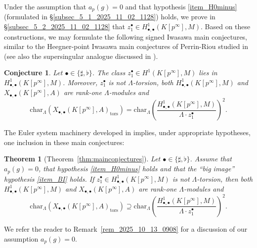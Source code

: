 \documentclass{amsart}
\numberwithin{equation}{section}
\newtheorem*{conjecture*}{Conjecture}
\newtheorem{lthm}{Theorem}
\newcommand{\Char}{\mathrm{char}}
\begin{document}
Under the assumption that $a_p(g)=0$ and that hypothesis \eqref{item_H0minus} (formulated in \S\ref{subsec_5_1_2025_11_02_1128}) holds, we prove in \S\ref{subsec_5_2_2025_11_02_1128} that $z_1^\bullet\in H^1_{\bullet,\bullet}(K[p^\infty],M)$. Based on these constructions, we may formulate the following signed Iwasawa main conjectures, similar to the Heegner-point Iwasawa main conjectures of Perrin-Riou studied in \cite{PR-Heegner-IMC} (see also the supersingular analogue discussed in \cite{castellawan}).




\begin{conjecture*}
    Let $\bullet\in \lbrace \sharp,\flat\rbrace$. The class $z_1^\bullet\in H^1(K[p^\infty],M)$ lies in $H^1_{\bullet,\bullet}(K[p^\infty],M)$. Moreover, $z_1^\bullet$ is not $\Lambda$-torsion, both $H^1_{\bullet,\bullet}(K[p^\infty],M)$ and $X_{\bullet,\bullet}(K[p^\infty],A)$ are rank-one $\Lambda$-modules and
    \[
    \Char_{\Lambda}\left(X_{\bullet,\bullet}(K[p^\infty],A)_{\mathrm{tors}}\right)=\Char_\Lambda\left(\frac{H^1_{\bullet,\bullet}(K[p^\infty],M)}{\Lambda \cdot z_1^\bullet}\right)^2.
    \]
\end{conjecture*}

The Euler system machinery developed in \cite{JNS} implies, under appropriate hypotheses, one inclusion in these main conjectures:

\begin{lthm}[Theorem~\ref{thm:mainconjectures}]\label{thmD}
Let $\bullet\in\lbrace \sharp,\flat\rbrace$. Assume that $a_p(g)=0$, that hypothesis \eqref{item_H0minus} holds and that the ``big image'' hypothesis \eqref{item_BI} holds. If $z_1^\bullet\in H^1_{\bullet,\bullet}(K[p^\infty],M)$ is not $\Lambda$-torsion, then both $H^1_{\bullet,\bullet}(K[p^\infty],M)$ and $X_{\bullet,\bullet}(K[p^\infty],A)$ are rank-one $\Lambda$-modules and
\[
\Char_{\Lambda}\left(X_{\bullet,\bullet}(K[p^\infty],A)_{\mathrm{tors}}\right)\supseteq\Char_{\Lambda} \left(\frac{H^1_{\bullet,\bullet}(K[p^\infty],M)}{\Lambda \cdot z_1^\bullet} \right)^2.
\]
\end{lthm}

We refer the reader to Remark~\ref{rem_2025_10_13_0908} for a discussion of our assumption $a_p(g)=0$. 
\end{document}
